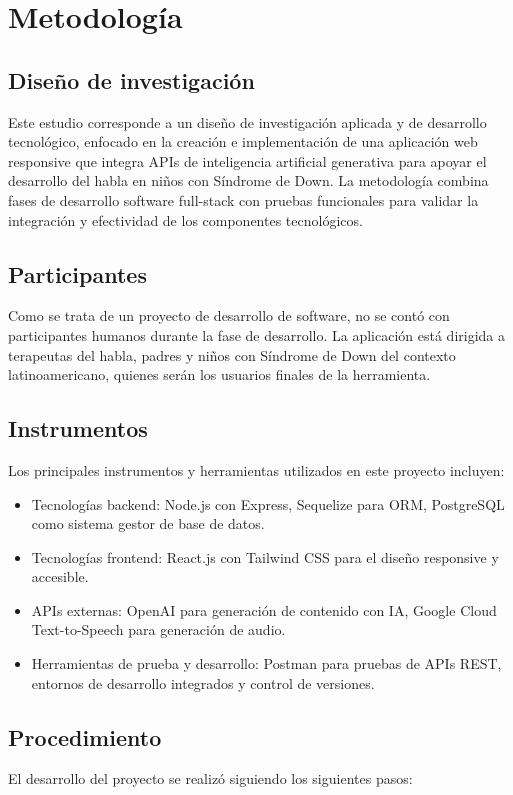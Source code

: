 \chapter{Metodología}

\section{Diseño de investigación}
Este estudio corresponde a un diseño de investigación aplicada y de desarrollo tecnológico, enfocado en la creación e implementación de una aplicación web responsive que integra APIs de inteligencia artificial generativa para apoyar el desarrollo del habla en niños con Síndrome de Down. La metodología combina fases de desarrollo software full-stack con pruebas funcionales para validar la integración y efectividad de los componentes tecnológicos.

\section{Participantes}
Como se trata de un proyecto de desarrollo de software, no se contó con participantes humanos durante la fase de desarrollo. La aplicación está dirigida a terapeutas del habla, padres y niños con Síndrome de Down del contexto latinoamericano, quienes serán los usuarios finales de la herramienta.

\section{Instrumentos}
Los principales instrumentos y herramientas utilizados en este proyecto incluyen:
\begin{itemize}
    \item Tecnologías backend: Node.js con Express, Sequelize para ORM, PostgreSQL como sistema gestor de base de datos.
    \item Tecnologías frontend: React.js con Tailwind CSS para el diseño responsive y accesible.
    \item APIs externas: OpenAI para generación de contenido con IA, Google Cloud Text-to-Speech para generación de audio.
    \item Herramientas de prueba y desarrollo: Postman para pruebas de APIs REST, entornos de desarrollo integrados y control de versiones.
\end{itemize}

\section{Procedimiento}
El desarrollo del proyecto se realizó siguiendo los siguientes pasos:

